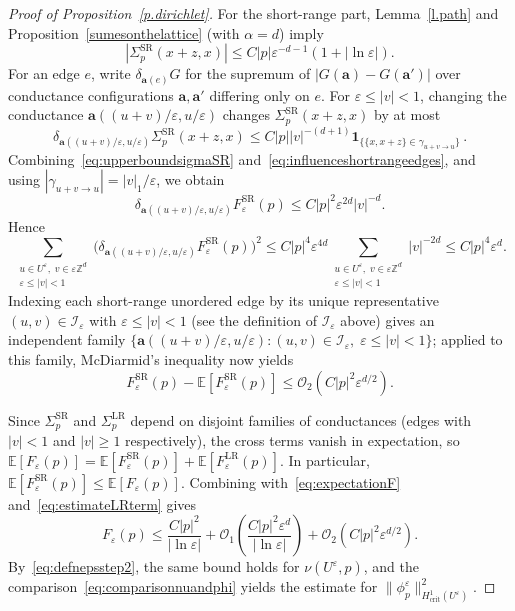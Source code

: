 \documentclass[11pt]{amsart}
\theoremstyle{plain}
\theoremstyle{definition}
\theoremstyle{remark}
\newcommand{\E}{\mathbb{E}}
\newcommand{\Zd}{\mathbb{Z}^d}
\renewcommand{\a}{\mathbf{a}}
\newcommand{\eps}{\varepsilon}
\begin{document}
\begin{proof}[Proof of Proposition~\ref{p.dirichlet}]
		For the short-range part, Lemma~\ref{l.path} and Proposition~\ref{sumesonthelattice} (with $\alpha = d$) imply
		\begin{equation} \label{eq:upperboundsigmaSR}
			|\Sigma_p^{\mathrm{SR}}(x+z,x)| \le C|p|\eps^{-d-1}(1+|\ln\eps|). %
		\end{equation}
		For an edge $e$, write $\delta_{\a(e)} G$ for the supremum of $|G(\a) - G(\a')|$ over conductance configurations $\a,\a'$ differing only on $e$.
		For $\eps \le |v| < 1$, changing the conductance $\a((u+v)/\eps, u/\eps)$ changes $\Sigma_p^{\mathrm{SR}}(x+z,x)$ by at most
		\begin{equation} \label{eq:influenceshortrangeedges}
			\delta_{\a((u+v)/\eps, u/\eps)} \Sigma_p^{\mathrm{SR}}(x+z,x) \le C|p||v|^{-(d+1)} \mathbf{1}_{\{\{x,x+z\} \in \gamma_{u+v \to u}\}}\,.
		\end{equation}
		Combining~\eqref{eq:upperboundsigmaSR} and~\eqref{eq:influenceshortrangeedges}, and using $|\gamma_{u+v \to u}| = |v|_1/\eps$, we obtain
		\[
		\delta_{\a((u+v)/\eps, u/\eps)} F_\eps^{\mathrm{SR}}(p) \le C|p|^2\eps^{2d}|v|^{-d}.
		\]
		Hence
		\[
		\sum_{\substack{u \in U^\eps,\; v \in \eps\Zd \\ \eps \le |v| < 1}} \bigl(\delta_{\a((u+v)/\eps, u/\eps)} F_\eps^{\mathrm{SR}}(p)\bigr)^2 \le C|p|^4\eps^{4d} \sum_{\substack{u \in U^\eps,\; v \in \eps\Zd \\ \eps \le |v| < 1}} |v|^{-2d} \le C|p|^4\eps^d.
		\]
		Indexing each short-range unordered edge by its unique representative $(u,v) \in \mathcal{I}_\eps$ with $\eps \le |v| < 1$ (see the definition of $\mathcal{I}_\eps$ above) gives an independent family $\{\a((u+v)/\eps, u/\eps) : (u,v) \in \mathcal{I}_\eps,\; \eps \le |v| < 1\}$; applied to this family, McDiarmid's inequality now yields
		\[
		F_\eps^{\mathrm{SR}}(p) - \E[F_\eps^{\mathrm{SR}}(p)] \le \mathcal{O}_2(C|p|^2\eps^{d/2}).
		\]
		
		Since $\Sigma_p^{\mathrm{SR}}$ and $\Sigma_p^{\mathrm{LR}}$ depend on disjoint families of conductances (edges with $|v| < 1$ and $|v| \ge 1$ respectively), the cross terms vanish in expectation, so $\E[F_\eps(p)] = \E[F_\eps^{\mathrm{SR}}(p)] + \E[F_\eps^{\mathrm{LR}}(p)]$.
		In particular, $\E[F_\eps^{\mathrm{SR}}(p)] \le \E[F_\eps(p)]$.
		Combining with~\eqref{eq:expectationF} and~\eqref{eq:estimateLRterm} gives
		\[
		F_\eps(p) \le \frac{C|p|^2}{|\ln\eps|} + \mathcal{O}_1\left(\frac{C|p|^2\eps^d}{|\ln\eps|}\right) + \mathcal{O}_2(C|p|^2\eps^{d/2}).
		\]
		By~\eqref{eq:defnepsstep2}, the same bound holds for $\nu(U^\eps, p)$, and the comparison~\eqref{eq:comparisonnuandphi} yields the estimate for $\|\phi_p^\eps\|_{H^1_{\mathrm{crit}}(U^\eps)}^2$.
	\end{proof}
	
\end{document}
